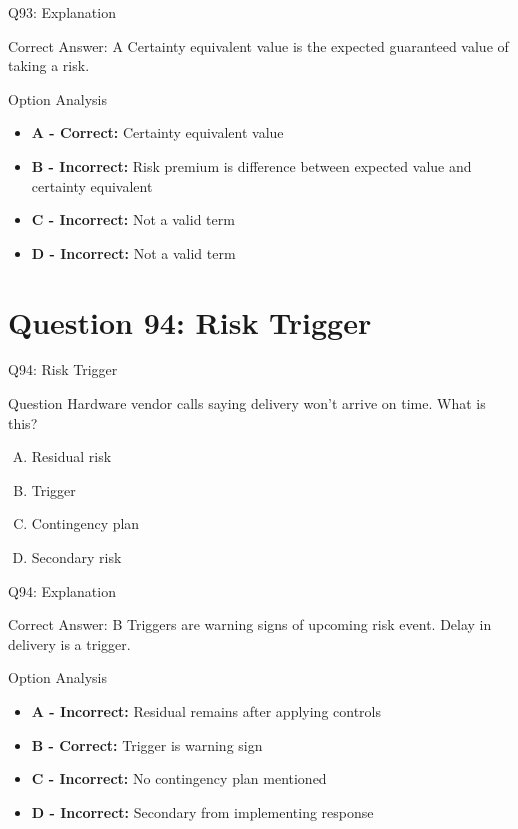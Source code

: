 \documentclass{beamer}
\begin{document}
	\begin{frame}{Q93: Explanation}
		\begin{block}{Correct Answer: A}
			Certainty equivalent value is the expected guaranteed value of taking a risk.
		\end{block}
		\begin{block}{Option Analysis}
			\begin{itemize}
				\item \textbf{A - Correct:} Certainty equivalent value
				\item \textbf{B - Incorrect:} Risk premium is difference between expected value and certainty equivalent
				\item \textbf{C - Incorrect:} Not a valid term
				\item \textbf{D - Incorrect:} Not a valid term
			\end{itemize}
		\end{block}
	\end{frame}
	
	\section{Question 94: Risk Trigger}
	
	\begin{frame}{Q94: Risk Trigger}
		\begin{block}{Question}
			Hardware vendor calls saying delivery won't arrive on time. What is this?
		\end{block}
		\begin{enumerate}[(A)]
			\item Residual risk
			\item Trigger
			\item Contingency plan
			\item Secondary risk
		\end{enumerate}
	\end{frame}
	
	\begin{frame}{Q94: Explanation}
		\begin{block}{Correct Answer: B}
			Triggers are warning signs of upcoming risk event. Delay in delivery is a trigger.
		\end{block}
		\begin{block}{Option Analysis}
			\begin{itemize}
				\item \textbf{A - Incorrect:} Residual remains after applying controls
				\item \textbf{B - Correct:} Trigger is warning sign
				\item \textbf{C - Incorrect:} No contingency plan mentioned
				\item \textbf{D - Incorrect:} Secondary from implementing response
			\end{itemize}
		\end{block}
	\end{frame}
	
\end{document}
